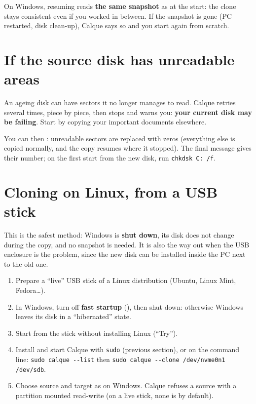 
On Windows, resuming reads \textbf{the same snapshot} as at the start: the clone stays consistent even
if you worked in between. If the snapshot is gone (PC restarted, disk clean-up), Calque says so and
you start again from scratch.


\section{If the source disk has unreadable areas}

An ageing disk can have sectors it no longer manages to read. Calque retries several times, piece by
piece, then stops and warns you: \textbf{your current disk may be failing}. Start by copying your
important documents elsewhere.

You can then : unreadable sectors are replaced with zeros (everything else is
copied normally, and the copy resumes where it stopped). The final message gives their number; on the
first start from the new disk, run \texttt{chkdsk C: /f}.

\section{Cloning on Linux, from a USB stick}\label{sec:linux}

This is the safest method: Windows is \textbf{shut down}, its disk does not change during the copy, and
no snapshot is needed. It is also the way out when the USB enclosure is the problem, since the new disk
can be installed inside the PC next to the old one.

\begin{enumerate}
\item Prepare a “live” USB stick of a Linux distribution (Ubuntu, Linux Mint, Fedora…).
\item In Windows, turn off \textbf{fast startup} (), then shut down: otherwise Windows leaves its disk in a “hibernated” state.
\item Start from the stick without installing Linux (“Try”).
\item Install and start Calque with \texttt{sudo} (previous section), or on the command line:
      \texttt{sudo calque -{}-list} then \texttt{sudo calque -{}-clone /dev/nvme0n1 /dev/sdb}.
\item Choose source and target as on Windows. Calque refuses a source with a partition mounted
      read-write (on a live stick, none is by default).
\end{enumerate}

